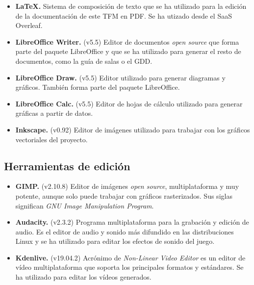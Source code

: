 \begin{itemize}
    \item \textbf{\LaTeX.} Sistema de composición de texto que se ha utilizado para la edición de la documentación de este \acs{TFM} en PDF. Se ha utizado desde el \acs{SaaS} Overleaf.
    
    \item \textbf{LibreOffice Writer.} (v5.5) Editor de documentos \textit{open source} que forma parte del paquete LibreOffice y que se ha utilizado para generar el resto de documentos, como la guía de salas o el \acs{GDD}. 
    
    \item \textbf{LibreOffice Draw.} (v5.5) Editor utilizado para generar diagramas y gráficos. También forma parte del paquete LibreOffice.
    
    \item \textbf{LibreOffice Calc.} (v5.5) Editor de hojas de cálculo utilizado para generar gráficas a partir de datos.
    
    \item \textbf{Inkscape.} (v0.92) Editor de imágenes utilizado para trabajar con los gráficos vectoriales del proyecto.
\end{itemize}


\subsection{Herramientas de edición}

\begin{itemize}
    \item \textbf{GIMP.} (v2.10.8) Editor de imágenes \textit{open source}, multiplataforma y muy potente, aunque solo puede trabajar con gráficos rasterizados. Sus siglas significan \textit{GNU Image Manipulation Program}.
    
    \item \textbf{Audacity.} (v2.3.2) Programa multiplataforma para la grabación y edición de audio. Es el editor de audio y sonido más difundido en las distribuciones Linux y se ha utilizado para editar los efectos de sonido del juego.
    
    \item \textbf{Kdenlive.} (v19.04.2) Acrónimo de \textit{Non-Linear Video Editor} es un editor de vídeo multiplataforma que soporta los principales formatos y estándares. Se ha utilizado para editar los vídeos generados.
\end{itemize}